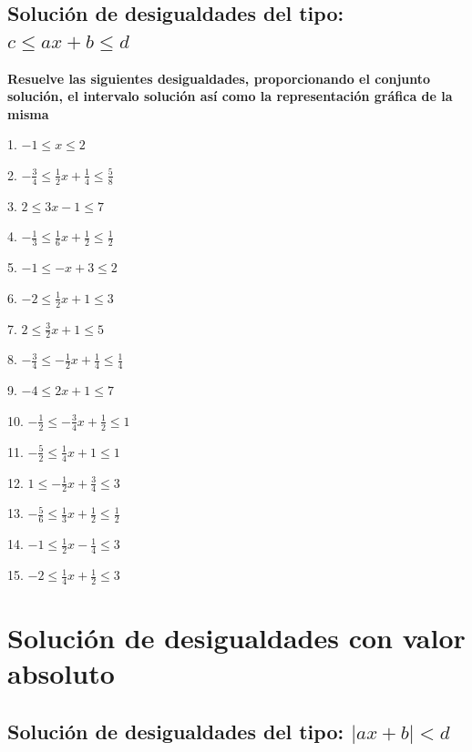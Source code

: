 \documentclass[]{book}
\begin{document}
\subsection{\texorpdfstring{Solución de desigualdades del tipo:
\(c\leq ax+b \leq d\)}{Solución de desigualdades del tipo: c\textbackslash{}leq ax+b \textbackslash{}leq d}}\label{soluciuxf3n-de-desigualdades-del-tipo-cleq-axb-leq-d}

\textbf{Resuelve las siguientes desigualdades, proporcionando el
conjunto solución, el intervalo solución así como la representación
gráfica de la misma}

\begin{multicols}{3}
1. $-1\leq x\leq 2$

2. $-\frac{3}{4}\leq \frac{1}{2}x+\frac{1}{4}\leq \frac{5}{8}$

3. $2\leq 3x-1\leq 7$

4. $-\frac{1}{3}\leq \frac{1}{6}x+\frac{1}{2}\leq \frac{1}{2}$

5. $-1\leq -x+3\leq 2$

6. $-2\leq \frac{1}{2}x+1\leq 3$

7. $2\leq \frac{3}{2}x+1\leq 5$

8. $-\frac{3}{4}\leq -\frac{1}{2}x+\frac{1}{4}\leq \frac{1}{4}$

9. $-4\leq 2x+1\leq 7$

10. $-\frac{1}{2}\leq -\frac{3}{4}x+\frac{1}{2}\leq 1$

11. $-\frac{5}{2}\leq \frac{1}{4}x+1\leq 1$

12. $1\leq -\frac{1}{2}x+\frac{3}{4}\leq 3$

13. $-\frac{5}{6}\leq \frac{1}{3}x+\frac{1}{2}\leq \frac{1}{2}$

14. $-1\leq \frac{1}{2}x-\frac{1}{4}\leq 3$

15. $-2\leq \frac{1}{4}x+\frac{1}{2}\leq 3$
\end{multicols}

\section{Solución de desigualdades con valor
absoluto}\label{soluciuxf3n-de-desigualdades-con-valor-absoluto}

\subsection{\texorpdfstring{Solución de desigualdades del tipo:
\(|ax+b| <d\)}{Solución de desigualdades del tipo: \textbar{}ax+b\textbar{} \textless{}d}}\label{soluciuxf3n-de-desigualdades-del-tipo-axb-d}
\end{document}

